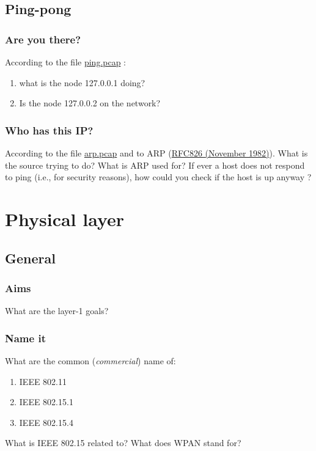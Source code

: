 \documentclass[11pt]{article}
\begin{document}
\subsection{Ping-pong}
\subsubsection{Are you there?}
According to the file \color{blue}\href{http://teaching.auzias.net/db/ping.pcap}{ping.pcap} \color{black}:
  \begin{enumerate}
    \item what is the node 127.0.0.1 doing?
    \item Is the node 127.0.0.2 on the network?
  \end{enumerate}
\subsubsection{Who has this IP?}
According to the file \color{blue}\href{http://teaching.auzias.net/db/arp.pcap}{arp.pcap} \color{black} and to ARP (\color{blue}\href{http://tools.ietf.org/html/rfc826}{RFC826 (November 1982)})\color{black}. What is the source trying to do? What is ARP used for? If ever a host does not respond to ping (i.e., for security reasons), how could you check if the host is up anyway ?


\section{Physical layer}
\subsection{General}
\subsubsection{Aims}
What are the layer-1 goals?
\subsubsection{Name it}
What are the common (\emph{commercial}) name of:
  \begin{enumerate}
    \item IEEE 802.11
    \item IEEE 802.15.1
    \item IEEE 802.15.4
  \end{enumerate}
What is IEEE 802.15 related to? What does WPAN stand for?
\end{document}

